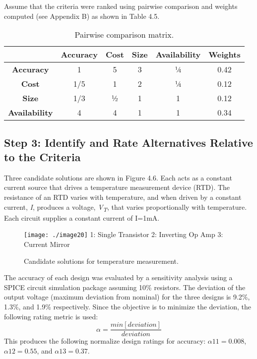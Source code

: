   Assume that the criteria were ranked using pairwise comparison and
  weights computed (see Appendix B) as shown in Table 4.5.

\begin{table}
\caption{Pairwise comparison matrix.}
\label{table:pairwiseCompMatrix}

\begin{tabular}{|c|c|c|c|c|c|}
\hline
  &
\textbf{Accuracy}&
\textbf{Cost}&
\textbf{Size}&
\textbf{Availability}& 
\textbf{Weights} \\ \hline

\textbf{Accuracy} & 1 & 5 & 3 & ¼ & 0.42 \\ \hline
\textbf{Cost} & 1/5 & 1 &  2  & ¼ & 0.12 \\ \hline
\textbf{Size} & 1/3 & ½ & 1 & 1 & 0.12 \\ \hline
\textbf{Availability} & 4 & 4 & 1  & 1 & 0.34 \\ \hline
\end{tabular}
\end{table}

\subsection*{Step 3: Identify and Rate Alternatives Relative to the Criteria}
\label{subsection:step-3-identify-and-rate-alternatives-relative-to-the-criteria}

Three candidate solutions are shown in Figure 4.6. Each acts as a
constant current source that drives a temperature measurement device
(RTD). The resistance of an RTD varies with temperature, and when driven
by a constant cur­rent, \emph{I}, produces a voltage,
\emph{V\textsubscript{T}}, that varies proportionally with temperature.
Each circuit supplies a constant current of I=1mA.

\begin{figure}
\caption{Candidate solutions for temperature measurement.}
\texttt{[image: ./image20]}
1: Single Transistor 2: Inverting Op Amp 3: Current Mirror
\label{figure:solutionsTemperature}
\end{figure}

The accuracy of each design was evaluated by a sensitivity analysis
using a SPICE cir­cuit simulation package assuming 10\% resistors. The
deviation of the output volt­age (maximum deviation from nominal) for the
three designs is 9.2\%, 1.3\%, and 1.9\% respectively. Since the
objective is to minimize the deviation, the following rating metric is
used:
$$ \alpha = \frac{min[deviation]}{deviation}$$
This produces the following normalize design ratings for accuracy:
$\alpha{11} = 0.008$, 
$\alpha{12} = 0.55$, and 
$\alpha{13} = 0.37$.

